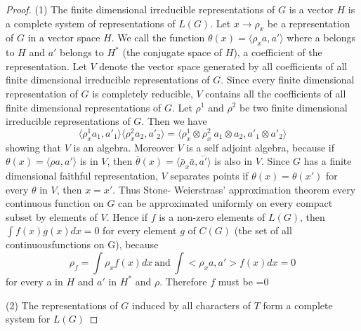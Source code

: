 \begin{proof}
  (1) The finite dimensional irreducible representations of $G$ is a
  vector $H$ is a complete system of representations of $L(G)$. Let $x
  \to \rho _x$ be a representation of $G$ in a vector space $H$. We
  call the function $\theta (x)=\langle \rho _x a,a' \rangle$ where a
  belongs to $H$ and $a'$ belongs to $H^\ast$ (the conjugate space of
  $H$), a coefficient of the representation. Let $V$ denote the vector
  space generated by all coefficients of all finite dimensional
  irreducible representations of $G$. Since every finite dimensional
  representation of $G$ is completely reducible, $V$ contains all the
  coefficients of all finite dimensional representations of $G$. Let
  $\rho^1$ and $\rho^2$ be two finite dimensional irreducible
  representations of $G$. Then we have  
  $$
  \langle \rho^1_x a_1,a'_1 \rangle \langle \rho^2_xa_2,a'_2 \rangle=
  \langle \rho^1_x \otimes \rho^2_x ~ a_1 \otimes a_2, a'_1 \otimes a'_2
  \rangle
  $$ 
 showing that $V$ is an algebra.  Moreover $V$ is a self adjoint
 algebra, because if $\theta (x)=\langle \rho a, a' \rangle$ is in $V$,
 then $\bar {\theta}(x)=\langle \bar{\rho}_x \bar{a}, \bar {a'} \rangle$
 is also in $V$. Since $G$ has a finite dimensional faithful
 representation, $V$ separates points \iec  if $\theta (x)=\theta (x')$
 for every $\theta$ in $V$, then $x=x'$. Thus Stone- Weierstrass'
 approximation theorem every continuous function on $G$ can be
 approximated uniformly on every compact subset by elements of
 $V$. Hence if $f$  is a non-zero elements of $L(G)$, then $\int
 f(x)g(x)dx=0$ for every element $g$ of $C(G)$ (the set of all
 continuous\pageoriginale functions on G), because 
 $$
 \rho_f = \int \rho_x f(x) dx~ \text{and}~ \int< \rho_x a,a'> f(x)dx=0
 $$ 
 for every a in $H$ and $a'$ in $H^*$ and $\rho$. Therefore $f$ must be =0 

 (2) The representations of $G$ induced by all characters of $T$ form a
 complete system for $L(G)$ 
 

\end{proof}

